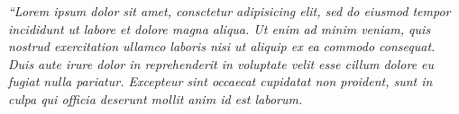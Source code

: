 \begin{epigrafe}
    \vspace*{\fill}
	\begin{flushright}
		\textit{``Lorem ipsum dolor sit amet, consctetur adipisicing elit, sed do eiusmod
		tempor incididunt ut labore et dolore magna aliqua. Ut enim ad minim veniam,
		quis nostrud exercitation ullamco laboris nisi ut aliquip ex ea commodo
		consequat. Duis aute irure dolor in reprehenderit in voluptate velit esse
		cillum dolore eu fugiat nulla pariatur. Excepteur sint occaecat cupidatat non
		proident, sunt in culpa qui officia deserunt mollit anim id est laborum.}
	\end{flushright}
\end{epigrafe}
